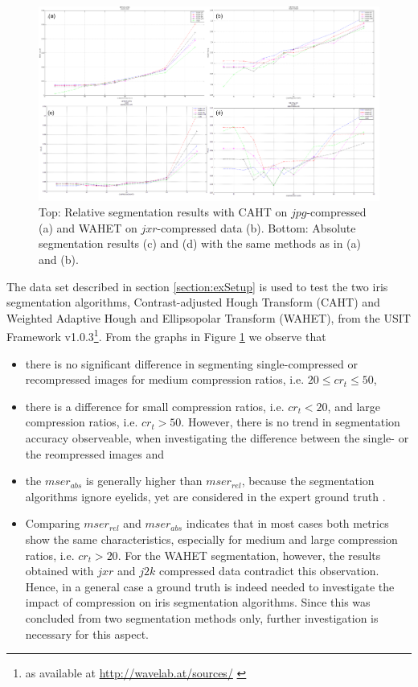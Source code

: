 \documentclass[10pt,twocolumn,letterpaper]{article}
\begin{document}
\begin{figure}[h]
	\begin{center}
		
	\includegraphics[width=\linewidth]{img/segResults}
\end{center}
	\caption{Top: Relative segmentation results with CAHT on $jpg$-compressed (a) and WAHET on $jxr$-compressed data (b). Bottom: Absolute segmentation results (c) and (d) with the same methods as in (a) and (b).}
	\label{fig:segResults}
	
\end{figure}

The data set described in section \ref{section:exSetup} is used to test the two iris segmentation algorithms, Contrast-adjusted Hough Transform (CAHT) and Weighted Adaptive Hough and Ellipsopolar Transform (WAHET), from the USIT Framework v1.0.3\footnote{as available at \url{http://wavelab.at/sources/} \cite{rathgeb}}. From the graphs in Figure \ref{fig:segResults} we observe that

\begin{itemize}
 \item there is no significant difference in segmenting single-compressed or recompressed images for medium compression ratios, i.e. $ 20 \leq cr_t \leq 50 $,
 \item there is a difference for small compression ratios, i.e. $cr_t < 20$, and large compression ratios, i.e. $cr_t > 50$. However, there is no trend in segmentation accuracy observeable, when investigating the difference between the single- or the reompressed images and%
 \item the $mser_{abs}$ is generally higher than $mser_{rel}$, because the segmentation algorithms ignore eyelids, yet are considered in the expert ground truth \cite{severeCompression}.
 \item Comparing $mser_{rel}$ and $mser_{abs}$ indicates that in most cases both metrics show the same characteristics, especially for medium and large compression ratios, i.e. $cr_t > 20$. For the WAHET segmentation, however, the results obtained with $jxr$ and $j2k$ compressed data contradict this observation. Hence, in a general case a ground truth is indeed needed to investigate the impact of compression on iris segmentation algorithms. Since this was concluded from two segmentation methods only, further investigation is necessary for this aspect.
\end{itemize}
\end{document}
